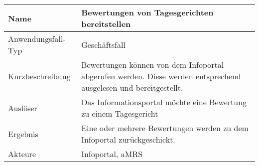 \begin{table}[H]
    \centering
    \label{bewertungenbereitstellen}
    \begin{tabularx}{\textwidth}{| l | X |}
        \hline
        Name               & Bewertungen von Tagesgerichten bereitstellen                                                                                                  \\
        \hline
        Anwendungsfall-Typ & Geschäftsfall                                                                                                                                 \\
        \hline
        Kurzbeschreibung   & Bewertungen können von dem Infoportal abgerufen werden. Diese werden entsprechend ausgelesen und bereitgestellt. \\
        \hline
        Auslöser           & Das Informationsportal möchte eine Bewertung zu einem Tagesgericht                                                                                                                             \\
        \hline
        Ergebnis           & Eine oder mehrere Bewertungen werden zu dem Infoportal zurückgeschickt.                                                                       \\
        \hline
        Akteure            & Infoportal, \ac{aMRS}                                                                                                                         \\
        \hline
    \end{tabularx}
\end{table}

